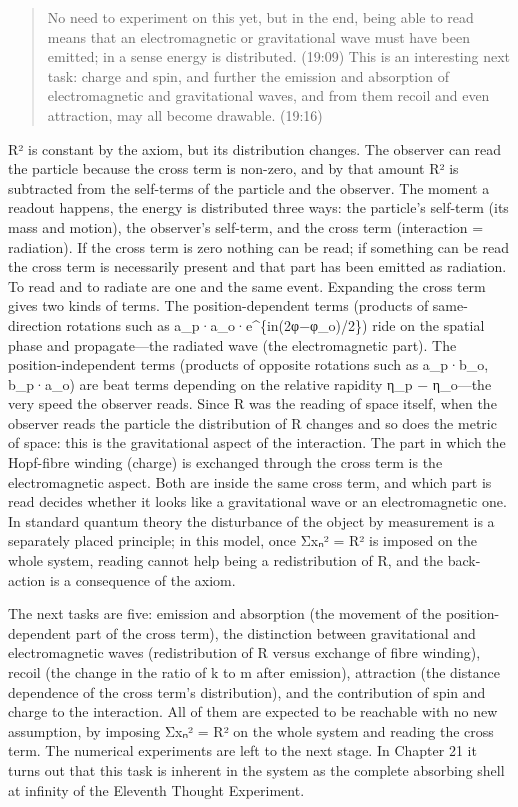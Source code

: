 \documentclass[
  a4paper,
]{article}
\begin{document}
\begin{quote}
No need to experiment on this yet, but in the end, being able to read
means that an electromagnetic or gravitational wave must have been
emitted; in a sense energy is distributed. (19:09) This is an
interesting next task: charge and spin, and further the emission and
absorption of electromagnetic and gravitational waves, and from them
recoil and even attraction, may all become drawable. (19:16)
\end{quote}

R² is constant by the axiom, but its distribution changes. The observer
can read the particle because the cross term is non-zero, and by that
amount R² is subtracted from the self-terms of the particle and the
observer. The moment a readout happens, the energy is distributed three
ways: the particle's self-term (its mass and motion), the observer's
self-term, and the cross term (interaction = radiation). If the cross
term is zero nothing can be read; if something can be read the cross
term is necessarily present and that part has been emitted as radiation.
To read and to radiate are one and the same event. Expanding the cross
term gives two kinds of terms. The position-dependent terms (products of
same-direction rotations such as a\_p·a\_o·e\^{}\{in(2φ−φ\_o)/2\}) ride
on the spatial phase and propagate---the radiated wave (the
electromagnetic part). The position-independent terms (products of
opposite rotations such as a\_p·b\_o, b\_p·a\_o) are beat terms
depending on the relative rapidity η\_p − η\_o---the very speed the
observer reads. Since R was the reading of space itself, when the
observer reads the particle the distribution of R changes and so does
the metric of space: this is the gravitational aspect of the
interaction. The part in which the Hopf-fibre winding (charge) is
exchanged through the cross term is the electromagnetic aspect. Both are
inside the same cross term, and which part is read decides whether it
looks like a gravitational wave or an electromagnetic one. In standard
quantum theory the disturbance of the object by measurement is a
separately placed principle; in this model, once Σxₙ² = R² is imposed on
the whole system, reading cannot help being a redistribution of R, and
the back-action is a consequence of the axiom.

The next tasks are five: emission and absorption (the movement of the
position-dependent part of the cross term), the distinction between
gravitational and electromagnetic waves (redistribution of R versus
exchange of fibre winding), recoil (the change in the ratio of k to m
after emission), attraction (the distance dependence of the cross term's
distribution), and the contribution of spin and charge to the
interaction. All of them are expected to be reachable with no new
assumption, by imposing Σxₙ² = R² on the whole system and reading the
cross term. The numerical experiments are left to the next stage. In
Chapter 21 it turns out that this task is inherent in the system as the
complete absorbing shell at infinity of the Eleventh Thought Experiment.
\end{document}

